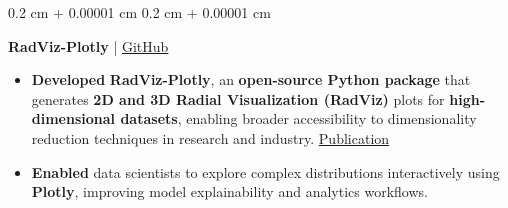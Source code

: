 \documentclass[10pt, letterpaper]{article}
\newenvironment{highlights}{
    \begin{itemize}[
        topsep=0.10 cm,
        parsep=0.10 cm,
        partopsep=0pt,
        itemsep=0pt,
        leftmargin=0.4 cm + 10pt
    ]
}{
    \end{itemize}
} %
\newenvironment{onecolentry}{
    \begin{adjustwidth}{
        0.2 cm + 0.00001 cm
    }{
        0.2 cm + 0.00001 cm
    }
}{
    \end{adjustwidth}
} %
\let\hrefWithoutArrow\href
\renewcommand{\href}[2]{\hrefWithoutArrow{#1}{#2}}
\begin{document}
\begin{onecolentry}
    \textbf{RadViz-Plotly} | \href{https://github.com/elewah/RadViz-Plotly}{GitHub}
    \begin{highlights}
        \item \textbf{Developed} \textbf{RadViz-Plotly}, an \textbf{open-source Python package} that generates \textbf{2D and 3D Radial Visualization (RadViz)} plots for \textbf{high-dimensional datasets}, enabling broader accessibility to dimensionality reduction techniques in research and industry. \href{https://ieeexplore.ieee.org/document/9504983}{Publication}
        
        \item \textbf{Enabled} data scientists to explore complex distributions interactively using \textbf{Plotly}, improving model explainability and analytics workflows.
    \end{highlights}
\end{onecolentry}




\end{document}
